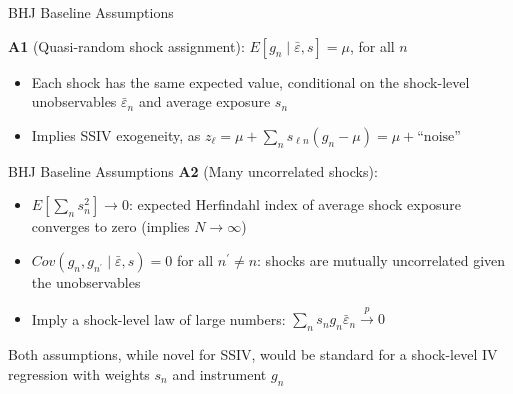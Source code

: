 \documentclass[t]{beamer}
\begin{document}
\begin{frame}{BHJ Baseline Assumptions}

\vspace{-0.3cm}
 \textbf{A1} (Quasi-random shock assignment): $E[g_n\mid\bar{\varepsilon},s]=\mu$, for all $ n$

\begin{itemize}
  \item Each shock has the same expected value, conditional on the shock-level unobservables $\bar{\varepsilon}_n$ and average exposure $s_n$\pause

  \item Implies SSIV exogeneity, as $z_\ell=\mu+\sum_n s_{\ell n}(g_n-\mu)=\mu+\text{``noise''}$ 
\end{itemize}

\end{frame}

\begin{frame}{BHJ Baseline Assumptions}
\textbf{A2} (Many uncorrelated shocks):
\begin{itemize}
  \item  $E\left[\sum_n s_n^2\right]\rightarrow 0$: expected Herfindahl index of average shock exposure converges to zero (implies $N\rightarrow \infty$)

  \item $Cov(g_n,g_{n^\prime}\mid\bar{\varepsilon},s)=0$ for all $n^\prime\ne n$: shocks are mutually uncorrelated given the unobservables

  \pause
  \item Imply a shock-level law of large numbers: $\sum_n s_n g_n\bar{\varepsilon}_n\xrightarrow{p} 0$
\end{itemize}\medskip\pause
 
Both assumptions, while novel for SSIV, would be standard for a shock-level IV regression with weights $s_n$ and instrument $g_n$

\end{frame}
\end{document}
